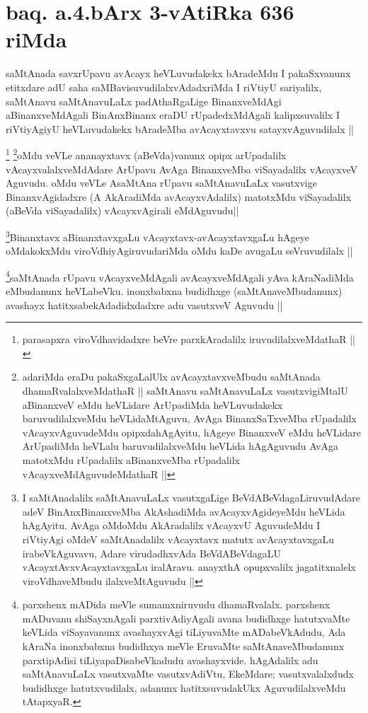 \section*{baq. a.4.bArx 3-vAtiRka 636 riMda}
\begin{artha}
saMtAnada savxrUpavu avAcayx heVLuvudakekx bAradeMdu I pakaSxvanunx etitxdare adU saha saMBavisuvudilalxvAdadxriMda I riVtiyU sariyalilx, saMtAnavu saMtAnavuLaLx padAthaRgaLige BinanxveMdAgi aBinanxveMdAgali BinAnxBinanx eraDU rUpadedxMdAgali kalipxsuvalilx I riVtiyAgiyU heVLuvudakekx bAradeMba avAcayxtavxvu satayxvAguvudilalx ||
\end{artha}

\begin{artha}
\footnote{parasapxra viroVdhavidadxre beVre parxkAradalilx iruvudilalxveMdathaR ||}
\footnote{adariMda eraDu pakaSxgaLalUlx avAcayxtavxveMbudu saMtAnada dhamaRvalalxveMdathaR || saMtAnavu saMtAnavuLaLx vasutxvigiMtalU aBinanxveV eMdu heVLidare ArUpadiMda heVLuvudakekx baruvudilalxveMdu heVLidaMtAguvu, AvAga BinanxSaTxveMba rUpadalilx vAcayxvAguvudeMdu opipxdahAgAyitu, hAgeye BinanxveV eMdu heVLidare ArUpadiMda heVLalu baruvudilalxveMdu heVLida hAgAguvudu AvAga matotxMdu rUpadalilx aBinanxveMba rUpadalilx vAcayxveMdAguvudeMdathaR ||}oMdu veVLe ananayxtavx (aBeVda)vanunx opipx arUpadalilx vAcayxvalalxveMdAdare ArUpavu AvAga BinanxveMba viSayadalilx vAcayxveV Aguvudu. oMdu veVLe AsaMtAna rUpavu saMtAnavuLaLx vasutxvige BinanxvAgidadxre (A AkAradiMda avAcayxvAdalilx) matotxMdu viSayadalilx (aBeVda viSayadalilx) vAcayxvAgirali eMdAguvudu||
\end{artha}

\begin{artha}
\footnote{I saMtAnadalilx saMtAnavuLaLx vasutxgaLige BeVdABeVdagaLiruvudAdare adeV BinAnxBinanxveMba AkAshadiMda avAcayxvAgideyeMdu heVLida hAgAyitu. AvAga oMdoMdu AkAradalilx vAcayxvU AguvudeMdu I riVtiyAgi oMdeV saMtAnadalilx vAcayxtavx matutx avAcayxtavxgaLu irabeVkAguvavu, Adare virudadhxvAda BeVdABeVdagaLU vAcayxtAvxvAcayxtavxgaLu iralAravu. anayxthA opupxvalilx jagatitxnalelx viroVdhaveMbudu ilalxveMtAguvudu ||}Binanxtavx aBinanxtavxgaLu vAcayxtavx-avAcayxtavxgaLu hAgeye oMdakokxMdu viroVdhiyAgiruvudariMda oMdu kaDe avugaLu seVruvudilalx ||
\end{artha}

\begin{artha}
\footnote{parxshenx mADida meVle sumamxniruvudu dhamaRvalalx. parxshenx mADuvanu shiSayxnAgali parxtivAdiyAgali avana budidhxge hatutxvaMte keVLida viSayavanunx avashayxvAgi tiLiyuvaMte mADabeVkAdudu, Ada kAraNa inonxbabxna budidhxya meVle EruvaMte saMtAnaveMbudanunx parxtipAdisi tiLiyapaDisabeVkadudu avashayxvide. hAgAdalilx adu saMtAnavuLaLx vasutxvaMte vasutxvAdiVtu, EkeMdare; vasutxvalalxdudx budidhxge hatutxvudilalx, adanunx hatitxsuvudakUkx AguvudilalxveMdu tAtapxyaR.}saMtAnada rUpavu vAcayxveMdAgali avAcayxveMdAgali yAva kAraNadiMda eMbudanunx heVLabeVku. inonxbabxna budidhxge (saMtAnaveMbudanunx) avashayx hatitxsabekAdadidxdadxre adu vasutxveV Aguvudu ||
\end{artha}

